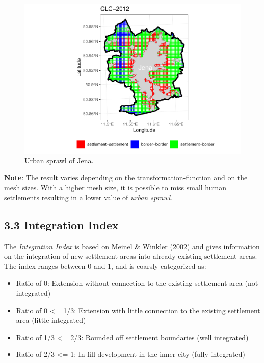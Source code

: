 \documentclass[]{article}
\providecommand{\tightlist}{%
  \setlength{\itemsep}{0pt}\setlength{\parskip}{0pt}}
\begin{document}
\begin{figure}[!h]

{\centering \includegraphics{vignette_R_files/figure-latex/unnamed-chunk-9-1} 

}

\caption{Urban sprawl of Jena.}\label{fig:unnamed-chunk-9}
\end{figure}

\textbf{Note}: The result varies depending on the
transformation-function and on the mesh sizes. With a higher mesh size,
it is possible to miss small human settlements resulting in a lower
value of \emph{urban sprawl}.

\subsection{3.3 Integration Index}\label{integration-index}

The \emph{Integration Index} is based on
\href{https://www2.ioer.de/recherche/pdf/2002_meinel_earsel.pdf}{Meinel
\& Winkler (2002)} and gives information on the integration of new
settlement areas into already existing settlement areas. The index
ranges between 0 and 1, and is coarsly categorized as:

\begin{itemize}
\tightlist
\item
  Ratio of 0: Extension without connection to the existing settlement
  area (not integrated)
\item
  Ratio of 0 \textless{}= 1/3: Extension with little connection to the
  existing settlement area (little integrated)
\item
  Ratio of 1/3 \textless{}= 2/3: Rounded off settlement boundaries (well
  integrated)
\item
  Ratio of 2/3 \textless{}= 1: In-fill development in the inner-city
  (fully integrated)
\end{itemize}
\end{document}
